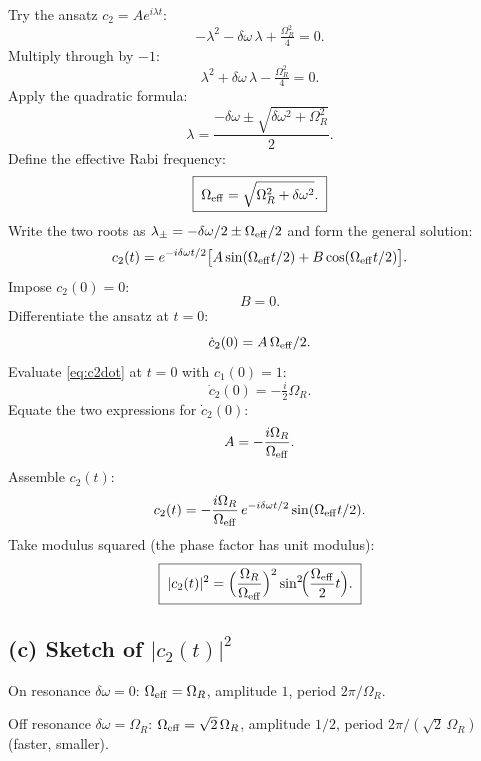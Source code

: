 \documentclass[11pt]{article}
\begin{document}
Try the ansatz $c_2=Ae^{i\lambda t}$:
\[
-\lambda^{2}-\delta\omega\,\lambda+\tfrac{\Omega_R^{2}}{4}=0.
\]
Multiply through by $-1$:
\[
\lambda^{2}+\delta\omega\,\lambda-\tfrac{\Omega_R^{2}}{4}=0.
\]
Apply the quadratic formula:
\[
\lambda=\frac{-\delta\omega\pm\sqrt{\delta\omega^{2}+\Omega_R^{2}}}{2}.
\]
Define the effective Rabi frequency:
\[
\boxed{\;\Omega_{\rm eff}=\sqrt{\Omega_R^{2}+\delta\omega^{2}}.\;}
\]
Write the two roots as $\lambda_\pm=-\delta\omega/2\pm\Omega_{\rm eff}/2$ and form the general solution:
\[
c_2(t)=e^{-i\delta\omega t/2}\bigl[A\sin(\Omega_{\rm eff}t/2)+B\cos(\Omega_{\rm eff}t/2)\bigr].
\]
Impose $c_2(0)=0$:
\[
B=0.
\]
Differentiate the ansatz at $t=0$:
\[
\dot c_2(0)=A\,\Omega_{\rm eff}/2.
\]
Evaluate \eqref{eq:c2dot} at $t=0$ with $c_1(0)=1$:
\[
\dot c_2(0)=-\tfrac{i}{2}\Omega_R.
\]
Equate the two expressions for $\dot c_2(0)$:
\[
A=-\frac{i\Omega_R}{\Omega_{\rm eff}}.
\]
Assemble $c_2(t)$:
\[
c_2(t)=-\frac{i\Omega_R}{\Omega_{\rm eff}}\,e^{-i\delta\omega t/2}\sin(\Omega_{\rm eff}t/2).
\]
Take modulus squared (the phase factor has unit modulus):
\begin{equation}
\boxed{\;|c_2(t)|^{2}=\Bigl(\frac{\Omega_R}{\Omega_{\rm eff}}\Bigr)^{2}\sin^{2}\!\Bigl(\frac{\Omega_{\rm eff}}{2}t\Bigr).\;}
\label{eq:rabi}
\end{equation}

\subsection*{(c) Sketch of $|c_2(t)|^{2}$}

On resonance $\delta\omega=0$: $\Omega_{\rm eff}=\Omega_R$, amplitude $1$, period $2\pi/\Omega_R$.

Off resonance $\delta\omega=\Omega_R$: $\Omega_{\rm eff}=\sqrt2\,\Omega_R$, amplitude $1/2$, period $2\pi/(\sqrt2\,\Omega_R)$ (faster, smaller).

\begin{center}
\end{center}
\end{document}
